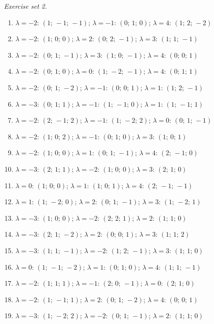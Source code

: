 \par\noindent\emph{Exercise set 2.}\nopagebreak
\begin{enumerate}[label=\arabic*., leftmargin=*, itemsep=1pt]
\item $\lambda=-2$: $(1;\,-1;\,-1)$; $\lambda=-1$: $(0;\,1;\,0)$; $\lambda=4$: $(1;\,2;\,-2)$
\item $\lambda=-2$: $(1;\,0;\,0)$; $\lambda=2$: $(0;\,2;\,-1)$; $\lambda=3$: $(1;\,1;\,-1)$
\item $\lambda=-2$: $(0;\,1;\,-1)$; $\lambda=3$: $(1;\,0;\,-1)$; $\lambda=4$: $(0;\,0;\,1)$
\item $\lambda=-2$: $(0;\,1;\,0)$; $\lambda=0$: $(1;\,-2;\,-1)$; $\lambda=4$: $(0;\,1;\,1)$
\item $\lambda=-2$: $(0;\,1;\,-2)$; $\lambda=-1$: $(0;\,0;\,1)$; $\lambda=1$: $(1;\,2;\,-1)$
\item $\lambda=-3$: $(0;\,1;\,1)$; $\lambda=-1$: $(1;\,-1;\,0)$; $\lambda=1$: $(1;\,-1;\,1)$
\item $\lambda=-2$: $(2;\,-1;\,2)$; $\lambda=-1$: $(1;\,-2;\,2)$; $\lambda=0$: $(0;\,1;\,-1)$
\item $\lambda=-2$: $(1;\,0;\,2)$; $\lambda=-1$: $(0;\,1;\,0)$; $\lambda=3$: $(1;\,0;\,1)$
\item $\lambda=-2$: $(1;\,0;\,0)$; $\lambda=1$: $(0;\,1;\,-1)$; $\lambda=4$: $(2;\,-1;\,0)$
\item $\lambda=-3$: $(2;\,1;\,1)$; $\lambda=-2$: $(1;\,0;\,0)$; $\lambda=3$: $(2;\,1;\,0)$
\item $\lambda=0$: $(1;\,0;\,0)$; $\lambda=1$: $(1;\,0;\,1)$; $\lambda=4$: $(2;\,-1;\,-1)$
\item $\lambda=1$: $(1;\,-2;\,0)$; $\lambda=2$: $(0;\,1;\,-1)$; $\lambda=3$: $(1;\,-2;\,1)$
\item $\lambda=-3$: $(1;\,0;\,0)$; $\lambda=-2$: $(2;\,2;\,1)$; $\lambda=2$: $(1;\,1;\,0)$
\item $\lambda=-3$: $(2;\,1;\,-2)$; $\lambda=2$: $(0;\,0;\,1)$; $\lambda=3$: $(1;\,1;\,2)$
\item $\lambda=-3$: $(1;\,1;\,-1)$; $\lambda=-2$: $(1;\,2;\,-1)$; $\lambda=3$: $(1;\,1;\,0)$
\item $\lambda=0$: $(1;\,-1;\,-2)$; $\lambda=1$: $(0;\,1;\,0)$; $\lambda=4$: $(1;\,1;\,-1)$
\item $\lambda=-2$: $(1;\,1;\,1)$; $\lambda=-1$: $(2;\,0;\,-1)$; $\lambda=0$: $(2;\,1;\,0)$
\item $\lambda=-2$: $(1;\,-1;\,1)$; $\lambda=2$: $(0;\,1;\,-2)$; $\lambda=4$: $(0;\,0;\,1)$
\item $\lambda=-3$: $(1;\,-2;\,2)$; $\lambda=-2$: $(0;\,1;\,-1)$; $\lambda=2$: $(1;\,1;\,0)$

\end{enumerate}
